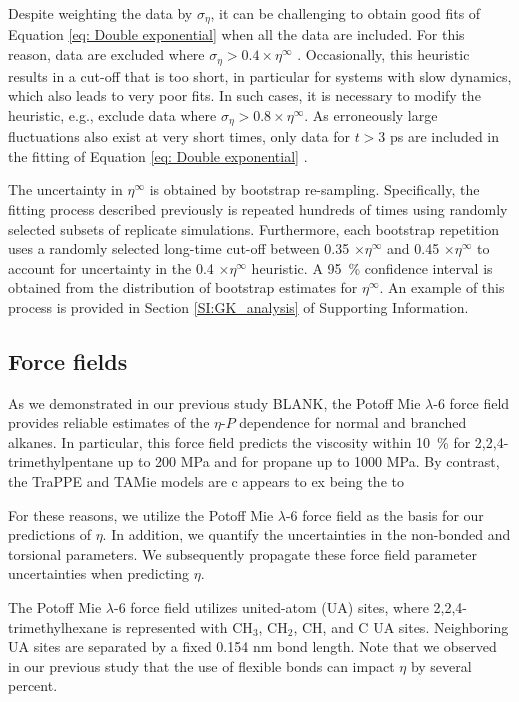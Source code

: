 \documentclass[preprint,review,12pt]{elsarticle}
\begin{document}
	Despite weighting the data by $\sigma_{\eta}$, it can be challenging to obtain good fits of Equation \ref{eq: Double exponential} when all the data are included. For this reason, data are excluded where $\sigma_{\eta} > 0.4 \times \eta^{\infty}$ \cite{Maginn2018,Zhang2015}. Occasionally, this heuristic results in a cut-off that is too short, in particular for systems with slow dynamics, which also leads to very poor fits. In such cases, it is necessary to modify the heuristic, e.g., exclude data where $\sigma_{\eta} > 0.8 \times \eta^{\infty}$. As erroneously large fluctuations also exist at very short times, only data for $t > 3$ ps are included in the fitting of Equation \ref{eq: Double exponential} \cite{Maginn2018,Zhang2015}. 
	 
	The uncertainty in $\eta^{\infty}$ is obtained by bootstrap re-sampling. Specifically, the fitting process described previously is repeated hundreds of times using randomly selected subsets of replicate simulations. Furthermore, each bootstrap repetition uses a randomly selected long-time cut-off between 0.35 $\times \eta^{\infty}$ and 0.45 $\times \eta^{\infty}$ to account for uncertainty in the 0.4 $\times \eta^{\infty}$ heuristic. A 95~\% confidence interval is obtained from the distribution of bootstrap estimates for $\eta^\infty$. An example of this process is provided in Section \ref{SI:GK_analysis} of Supporting Information.
	
	\subsection{Force fields} \label{Force Field}
	
	As we demonstrated in our previous study BLANK, the Potoff Mie $\lambda$-6 force field provides reliable estimates of the $\eta$-$P$ dependence for normal and branched alkanes. In particular, this force field predicts the viscosity within 10~\% for 2,2,4-trimethylpentane up to 200 MPa and for propane up to 1000 MPa. By contrast, the TraPPE and TAMie models are c appears to ex being the  to 
	
	For these reasons, we utilize the Potoff Mie $\lambda$-6 force field as the basis for our predictions of $\eta$. In addition, we quantify the uncertainties in the non-bonded and torsional parameters. We subsequently propagate these force field parameter uncertainties when predicting $\eta$. 
	
	The Potoff Mie $\lambda$-6 force field utilizes united-atom (UA) sites, where 2,2,4-trimethylhexane is represented with CH$_3$, CH$_2$, CH, and C UA sites. Neighboring UA sites are separated by a fixed 0.154 nm bond length. Note that we observed in our previous study that the use of flexible bonds can impact $\eta$ by several percent. 
	
\end{document}
